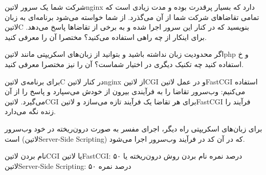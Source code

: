 
شرکت شما یک سرور ‌لاتین{nginx} دارد که بسیار پرقدرت بوده و مدت زیادی است که تمامی تقاضاهای شرکت شما از آن می‌گذرد. از شما خواسته می‌شود برنامه‌ای به زبان ‌لاتین{C} بنویسید که در کنار این سرور اجرا شده و به برخی از تقاضاها پاسخ می‌دهد. برای اینکار از چه راهی استفاده می‌کنید؟ مختصرا آن را معرفی کنید.

اگر محدودیت زبان نداشته باشید و بتوانید از زبان‌های اسکریپتی مانند ‌لاتین{php} و ‌خ استفاده کنید چه تکنیک دیگری در اختیار شماست؟ آن را نیز مختصرا معرفی کنید.


\begin{پاسخ}

برای برنامه‌ی ‌لاتین{C} در کنار ‌لاتین{nginx} از ‌لاتین{CGI} و در عمل ‌لاتین{FastCGI} استفاده می‌کنیم:
وب‌سرور تقاضا را به فرآیندی بیرون از خودش می‌سپارد و پاسخ را از آن می‌گیرد.
‌لاتین{CGI} برای هر تقاضا یک فرآیند تازه می‌سازد و ‌لاتین{FastCGI} فرآیند را زنده نگه می‌دارد.

برای زبان‌های اسکریپتی راه دیگر، اجرای مفسر به صورت درون‌ریخته در خود وب‌سرور است (‌لاتین{Server-Side Scripting}) که در آن کد در فرآیند وب‌سرور اجرا می‌شود.

 نام بردن ‌لاتین{CGI} یا ‌لاتین{FastCGI}: ۵۰ درصد نمره
 نام بردن روش درون‌ریخته یا ‌لاتین{Server-Side Scripting}: ۵۰ درصد نمره

\end{پاسخ}
